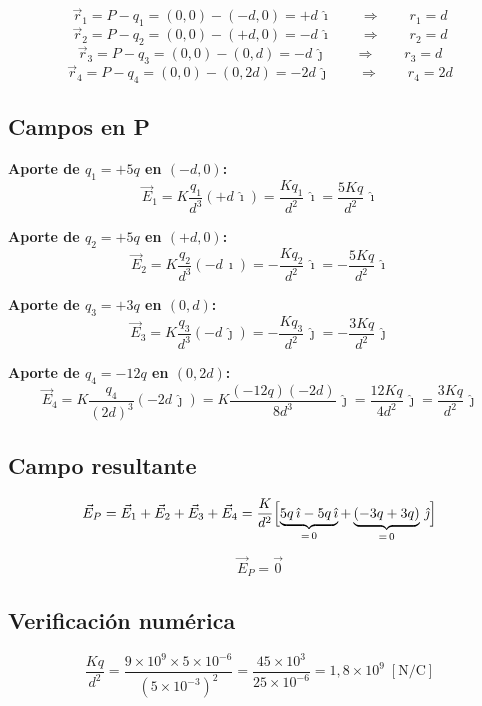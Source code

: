 \documentclass[12pt,letterpaper]{article}
\begin{document}
\[
    \vec{r}_1 = P - q_1 = (0,0)-(-d,0) = +d\,\hat{\imath}
    \qquad\Rightarrow\qquad r_1 = d
\]
\[
    \vec{r}_2 = P - q_2 = (0,0)-(+d,0) = -d\,\hat{\imath}
    \qquad\Rightarrow\qquad r_2 = d
\]
\[
    \vec{r}_3 = P - q_3 = (0,0)-(0,d) = -d\,\hat{\jmath}
    \qquad\Rightarrow\qquad r_3 = d
\]
\[
    \vec{r}_4 = P - q_4 = (0,0)-(0,2d) = -2d\,\hat{\jmath}
    \qquad\Rightarrow\qquad r_4 = 2d
\]

\subsection*{Campos en P}

\noindent\textbf{Aporte de $q_1 = +5q$ en $(-d,0)$:}
\[
    \vec{E}_1 = K\frac{q_1}{d^3}(+d\,\hat{\imath})
    = \frac{Kq_1}{d^2}\,\hat{\imath} = \frac{5Kq}{d^2}\,\hat{\imath}
\]

\noindent\textbf{Aporte de $q_2 = +5q$ en $(+d,0)$:}
\[
    \vec{E}_2 = K\frac{q_2}{d^3}(-d\,\hat{\imath})
    = -\frac{Kq_2}{d^2}\,\hat{\imath} = -\frac{5Kq}{d^2}\,\hat{\imath}
\]

\noindent\textbf{Aporte de $q_3 = +3q$ en $(0,d)$:}
\[
    \vec{E}_3 = K\frac{q_3}{d^3}(-d\,\hat{\jmath})
    = -\frac{Kq_3}{d^2}\,\hat{\jmath} = -\frac{3Kq}{d^2}\,\hat{\jmath}
\]

\noindent\textbf{Aporte de $q_4 = -12q$ en $(0,2d)$:}
\[
    \vec{E}_4 = K\frac{q_4}{(2d)^3}(-2d\,\hat{\jmath})
    = K\frac{(-12q)(-2d)}{8d^3}\,\hat{\jmath}
    = \frac{12Kq}{4d^2}\,\hat{\jmath}
    = \frac{3Kq}{d^2}\,\hat{\jmath}
\]

\subsection*{Campo resultante}

\[
    \vec{E}_P = \vec{E}_1+\vec{E}_2+\vec{E}_3+\vec{E}_4
    = \frac{K}{d^2}\Bigl[
        \underbrace{5q\,\hat{\imath} - 5q\,\hat{\imath}}_{=\,0}
        +\underbrace{(-3q+3q)}_{{=\,0}}\,\hat{\jmath}
    \Bigr]
\]

\[
    \boxed{\vec{E}_P = \vec{0}}
\]

\subsection*{Verificaci\'on num\'erica}

\[
    \frac{Kq}{d^2} = \frac{9\times10^9\times5\times10^{-6}}{(5\times10^{-3})^2}
    = \frac{45\times10^3}{25\times10^{-6}} = 1{,}8\times10^9\;[\text{N/C}]
\]
\end{document}
